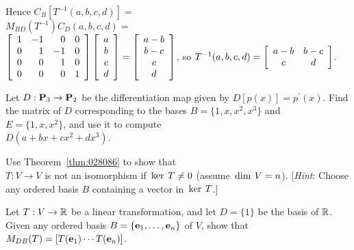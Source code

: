 \begin{multicols}{1}
\begin{ex}
\begin{sol}
\begin{enumerate}[label={\alph*.}]
Hence $C_B[T^{-1}(a, b, c, d)] = {}$ \\ $M_{BD}(T^{-1})C_D(a, b, c, d) = {}$ \\ $\left[ \begin{array}{rrrr} 1 & -1 & 0 & 0 \\ 0 & 1 & -1 & 0 \\ 0 & 0 & 1 & 0 \\ 0 & 0 & 0 & 1 \end{array} \right]\left[ \begin{array}{c} a \\ b \\ c \\ d \end{array} \right] = \left[ \begin{array}{c} a - b \\ b - c \\ c \\ d \end{array} \right]$, so 
$T^{-1}(a, b, c, d) = \left[ \begin{array}{cc} a -b & b - c \\ c & d \end{array} \right]$.


\end{enumerate}
\end{sol}
\end{ex}

\begin{ex}
Let $D : \textbf{P}_{3} \to \textbf{P}_{2}$ be the differentiation map given by $D[p(x)] = p^\prime(x)$. Find the matrix of $D$ corresponding to the bases $B = \{1, x, x^{2}, x^{3}\}$ and \\$E = \{1, x, x^{2}\}$, and use it to compute \\$D(a + bx + cx^{2} + dx^{3})$.
\end{ex}

\begin{ex}
Use Theorem~\ref{thm:028086} to show that \\$T : V \to V$ is not an isomorphism if $\thinspace\operatorname{ker \medspace}T \neq 0$ (assume $\thinspace\operatorname{dim \medspace}V = n$). [\textit{Hint}: Choose any ordered basis $B$ containing a vector in $\thinspace\operatorname{ker \medspace}T$.]
\end{ex}

\begin{ex}
Let $T : V \to \mathbb{R}$ be a linear transformation, and let $D = \{1\}$ be the basis of $\mathbb{R}$. Given any ordered basis $B = \{\textbf{e}_{1}, \dots, \textbf{e}_{n}\}$ of $V$, show that \\$M_{DB}(T) = [T(\textbf{e}_{1}) \cdots T(\textbf{e}_{n})]$.
\end{ex}


\end{multicols}
